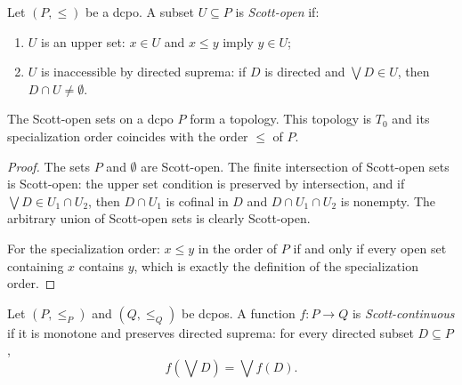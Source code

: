 \begin{definition}
Let $(P, \leq)$ be a dcpo. A subset $U \subseteq P$ is \emph{Scott-open} if:
\begin{enumerate}
  \item $U$ is an upper set: $x \in U$ and $x \leq y$ imply $y \in U$;
  \item $U$ is inaccessible by directed suprema: if $D$ is directed and
    $\bigvee D \in U$, then $D \cap U \neq \emptyset$.
\end{enumerate}
\end{definition}

\begin{proposition}
The Scott-open sets on a dcpo $P$ form a topology. This topology is $T_0$ and its
specialization order coincides with the order $\leq$ of $P$.
\end{proposition}

\begin{proof}
The sets $P$ and $\emptyset$ are Scott-open. The finite intersection of Scott-open sets is
Scott-open: the upper set condition is preserved by intersection, and if
$\bigvee D \in U_1 \cap U_2$, then $D \cap U_1$ is cofinal in $D$ and
$D \cap U_1 \cap U_2$ is nonempty. The arbitrary union of Scott-open sets is clearly
Scott-open.

For the specialization order: $x \leq y$ in the order of $P$ if and only if every open
set containing $x$ contains $y$, which is exactly the definition of the specialization
order.
\end{proof}

\begin{center}
\end{center}

\begin{definition}
Let $(P, \leq_P)$ and $(Q, \leq_Q)$ be dcpos. A function $f\colon P \to Q$ is
\emph{Scott-continuous} if it is monotone and preserves directed suprema: for every
directed subset $D \subseteq P$,
\[
  f\!\left(\bigvee D\right) = \bigvee f(D).
\]
\end{definition}

